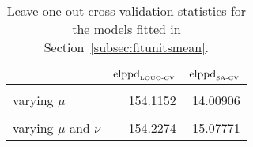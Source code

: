 \begin{table}
\centering
\caption{\label{tab:elppd_loo}Leave-one-out cross-validation statistics for the models fitted in Section~\ref{subsec:fitunitsmean}.}
\centering
\begin{tabular}[t]{lrr}
\toprule
  & $\hbox{elppd}_{\hbox{\tiny{LOUO-CV}}}$ & $\hbox{elppd}_{\hbox{\tiny{SA-CV}}}$\\
\midrule
\cellcolor{gray!10}{complete pooling} & \cellcolor{gray!10}{153.8700} & \cellcolor{gray!10}{15.17704}\\
varying $\mu$ & 154.1152 & 14.00906\\
\cellcolor{gray!10}{varying $\nu$} & \cellcolor{gray!10}{153.3352} & \cellcolor{gray!10}{15.12410}\\
varying $\mu$ and $\nu$ & 154.2274 & 15.07771\\
\bottomrule
\end{tabular}
\end{table}
